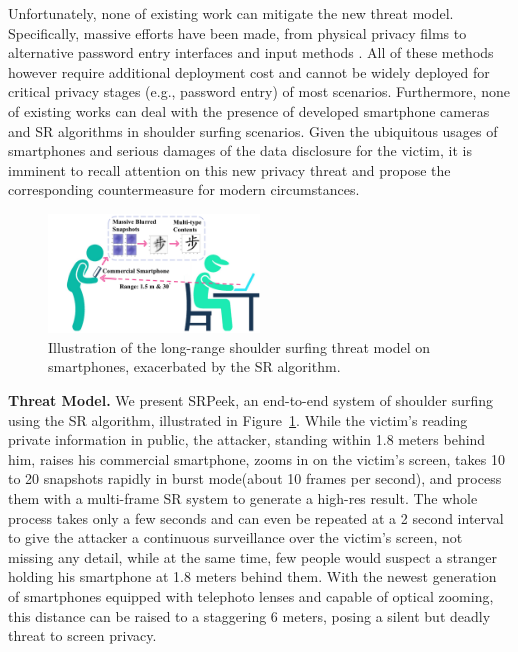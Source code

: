 
Unfortunately, none of existing work can mitigate the new threat model. Specifically, massive efforts have been made, from physical privacy films to alternative password entry interfaces \cite{wiedenbeck2006design,papadopoulos2017illusionpin} and input methods \cite{kumar2007reducing}. All of these methods however require additional deployment cost \cite{Chun2019Keep} and cannot be widely deployed for critical privacy stages (e.g., password entry) of most scenarios. Furthermore, none of existing works can deal with the presence of developed smartphone cameras and SR algorithms in shoulder surfing scenarios. Given the ubiquitous usages of smartphones and serious damages of the data disclosure for the victim, it is imminent to recall attention on this new privacy threat and propose the corresponding countermeasure for modern circumstances.

\begin{figure}
	\centering
	\includegraphics[width=0.5\textwidth]{pic/illustration.pdf}
    \caption{Illustration of the long-range shoulder surfing threat model on smartphones, exacerbated by the SR algorithm.}
	\label{illustration_of_system}
\end{figure}

\vspace{1mm}
\noindent
\textbf{Threat Model.} We present \textsf{SRPeek}, an end-to-end system of shoulder surfing using the SR algorithm, illustrated in Figure~\ref{illustration_of_system}. 
While the victim's reading private information in public, the attacker, standing within 1.8 meters behind him, raises his commercial smartphone, zooms in on the victim's screen, takes 10 to 20 snapshots rapidly in burst mode(about 10 frames per second), and process them with a multi-frame SR system to generate a high-res result. The whole process takes only a few seconds and can even be repeated at a 2 second interval to give the attacker a continuous surveillance over the victim's screen, not missing any detail, while at the same time, few people would suspect a stranger holding his smartphone at 1.8 meters behind them. With the newest generation of smartphones equipped with telephoto lenses and capable of optical zooming, this distance can be raised to a staggering 6 meters, posing a silent but deadly threat to screen privacy.

